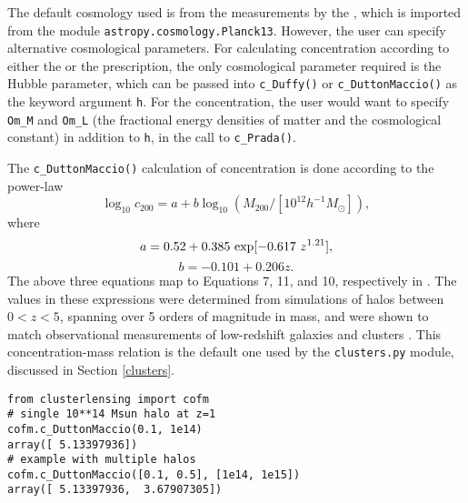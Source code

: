 \documentclass[twocolumn]{aastex6}
\newcommand{\code}{\lstinline[style=codeintext]}
\begin{document}
The default cosmology used is from the measurements by the \citet{PlanckXVI}, which is imported from the module \code{astropy.cosmology.Planck13}. However, the user can specify alternative cosmological parameters. For calculating concentration according to either the \citet{Duffy08} or the \citet{Dutton14} prescription, the only cosmological parameter required is the Hubble parameter, which can be passed into \code{c_Duffy()} or \code{c_DuttonMaccio()} as the keyword argument \code{h}. For the \citet{Prada12} concentration, the user would want to specify \code{Om_M} and \code{Om_L} (the fractional energy densities of matter and the cosmological constant) in addition to \code{h}, in the call to \code{c_Prada()}.

The \code{c_DuttonMaccio()} calculation of concentration is done according to the power-law
\begin{equation}
\log_{10} c_{200} = a + b \log_{10}(M_{200} / [10^{12} h^{-1} M_{\odot}]), 
\end{equation}
where
\begin{equation}
a = 0.52 + 0.385\ {\rm exp}[-0.617\ z^{1.21}],
\end{equation}
\begin{equation}
b = -0.101 + 0.206 z.
\end{equation}
The above three equations map to Equations 7, 11, and 10, respectively in \citet{Dutton14}. The values in these expressions were determined from simulations of halos between $0 < z < 5$, spanning over 5 orders of magnitude in mass, and were shown to match observational measurements of low-redshift galaxies and clusters \citep{Dutton14}. This concentration-mass relation is the default one used by the \code{clusters.py} module, discussed in Section \ref{clusters}.

\begin{lstlisting}
from clusterlensing import cofm
# single 10**14 Msun halo at z=1
cofm.c_DuttonMaccio(0.1, 1e14)
array([ 5.13397936])
# example with multiple halos
cofm.c_DuttonMaccio([0.1, 0.5], [1e14, 1e15])
array([ 5.13397936,  3.67907305])
\end{lstlisting}
\end{document}
